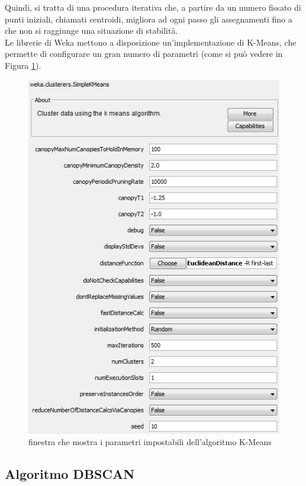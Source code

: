         Quindi, si tratta di una procedura iterativa che, a partire da un numero fissato di punti iniziali, chiamati centroidi, migliora ad ogni passo gli assegnamenti fino a che non si raggiunge una situazione di stabilità. \\

        Le librerie di Weka mettono a disposizione un'implementazione di K-Means, che permette di configurare un gran numero di parametri (come si può vedere in Figura \ref{kmeans_weka}).

        \begin{figure}
            \centering
            \caption{finestra che mostra i parametri impostabili dell'algoritmo K-Means}
            \label{kmeans_weka}
            \includegraphics[scale=0.90]{img/cluster_k_means.png}
        \end{figure}

    \subsection{Algoritmo DBSCAN}

